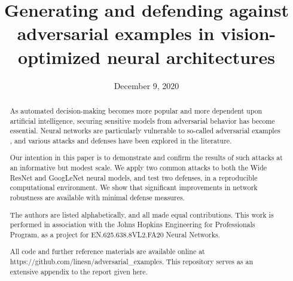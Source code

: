 \documentclass[conference]{IEEEtran}
\begin{document}
\title{Generating and defending against adversarial examples in
vision-optimized neural architectures}
\specialpapernotice{}
\date{December 9, 2020}

\author{
\and
{}
\and
{}
}%

\maketitle%

\begin{abstract}%

As automated decision-making becomes more popular and more dependent upon
artificial intelligence, securing sensitive models from adversarial behavior
has become essential. Neural networks are particularly vulnerable to
so-called adversarial examples \cite{szegedy2014intriguing}, and various
attacks and defenses have been explored in the literature.

Our intention in this paper is to demonstrate and confirm the results of
such attacks at an informative but modest scale. We apply two common attacks
to both the Wide ResNet and GoogLeNet neural models, and test two defenses,
in a reproducible computational environment. We show that significant
improvements in network robustness are available with minimal defense
measures.

The authors are listed alphabetically, and all made equal contributions.
This work is performed in association with the Johns Hopkins Engineering for
Professionals Program, as a project for EN.625.638.8VL2.FA20 Neural Networks.

All code and further reference materials are available online at
https://github.com/linesn/adversarial\_examples. This repository serves as
an extensive appendix to the report given here.

\end{abstract}%
\end{document}
